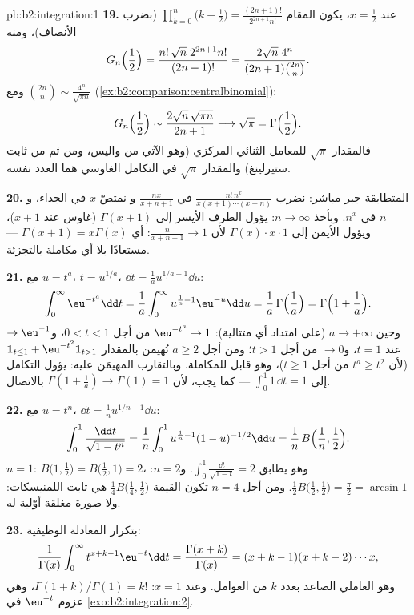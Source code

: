 \begin{solution}{pb:b2:integration:1}
\textbf{19.} عند $x = \frac12$، يكون المقام
$\prod_{k=0}^n\bigl(k+\frac12\bigr) =
\frac{(2n+1)!}{2^{2n+1}n!}$ (بضرب الأنصاف)، ومنه
\[
G_n\Bigl(\frac12\Bigr)
= \frac{n!\,\sqrt n\;2^{2n+1}n!}{(2n+1)!}
= \frac{2\sqrt n\;4^n}{(2n+1)\binom{2n}{n}} .
\]
ومع $\binom{2n}{n} \sim \frac{4^n}{\sqrt{\pi n}}$
(\cref{ex:b2:comparison:centralbinomial}):
\[
G_n\Bigl(\frac12\Bigr)
\sim \frac{2\sqrt n\,\sqrt{\pi n}}{2n+1}
\longrightarrow \sqrt\pi = \Gamma\Bigl(\frac12\Bigr) .
\]
فالمقدار $\sqrt\pi$ للمعامل الثنائي المركزي (وهو الآتي من
واليس، ومن ثم من ثابت ستيرلينغ) والمقدار $\sqrt\pi$ في التكامل
الغاوسي هما العدد نفسه.

\textbf{20.} المتطابقة جبر مباشر: نضرب
$\frac{n!\,n^x}{x(x+1)\cdots(x+n)}$ في $\frac{nx}{x+n+1}$ و
نمتصّ $x$ في الجداء، و$n$ في $n^x$. وبأخذ $n \to
\infty$: يؤول الطرف الأيسر إلى $\Gamma(x+1)$ (غاوس عند $x+1$)،
ويؤول الأيمن إلى $\Gamma(x)\cdot x\cdot 1$ لأن
$\frac{n}{x+n+1} \to 1$: أي $\Gamma(x+1) = x\Gamma(x)$ ---
مستعادًا بلا أي مكاملة بالتجزئة.

\textbf{21.} مع $u = t^a$، $t = u^{1/a}$، $\dd t = \frac1a
u^{1/a - 1}\dd u$:
\[
\int_0^\infty \eu^{-t^a}\dd t
= \frac1a\int_0^\infty u^{\frac1a - 1}\eu^{-u}\dd u
= \frac1a\,\Gamma\Bigl(\frac1a\Bigr)
= \Gamma\Bigl(1 + \frac1a\Bigr) .
\]
وحين $a \to +\infty$ (على امتداد أي متتالية): $\eu^{-t^a} \to 1$ من أجل
$0 < t < 1$، و$\to \eu^{-1}$ عند $t = 1$، و$\to 0$ من أجل $t > 1$؛
ومن أجل $a \geq 2$ نُهيمن بالمقدار $\mathbf 1_{t \leq 1} +
\eu^{-t^2}\mathbf 1_{t > 1}$ (لأن $t^a \geq t^2$ من أجل $t \geq 1$)،
وهو قابل للمكاملة. وبالتقارب المهيمَن عليه: يؤول التكامل إلى
$\int_0^1 1\,\dd t = 1$ --- كما يجب، لأن $\Gamma(1 +
\frac1a) \to \Gamma(1) = 1$ بالاتصال.

\textbf{22.} مع $u = t^n$، $\dd t = \frac1n u^{1/n - 1}\dd
u$:
\[
\int_0^1 \frac{\dd t}{\sqrt{1-t^n}}
= \frac1n\int_0^1 u^{\frac1n-1}(1-u)^{-1/2}\dd u
= \frac1n\,B\Bigl(\frac1n, \frac12\Bigr) .
\]
$n = 1$: $B\bigl(1,\frac12\bigr) = B\bigl(\frac12,1\bigr) = 2$،
وهو يطابق $\int_0^1\frac{\dd t}{\sqrt{1-t}} = 2$. و$n = 2$:
$\frac12 B\bigl(\frac12,\frac12\bigr) = \frac\pi2 = \arcsin 1$.
ومن أجل $n = 4$ تكون القيمة $\frac14 B\bigl(\frac14,\frac12\bigr)$ هي
ثابت اللمنيسكات: ولا صورة مغلقة أوّلية له.

\textbf{23.} بتكرار المعادلة الوظيفية:
\[
\frac{1}{\Gamma(x)}\int_0^\infty t^{x+k-1}\eu^{-t}\dd t
= \frac{\Gamma(x+k)}{\Gamma(x)}
= (x+k-1)(x+k-2)\cdots x ,
\]
وهو العاملي الصاعد بعدد $k$ من العوامل. وعند $x = 1$:
$\Gamma(1+k)/\Gamma(1) = k!$، وهي عزوم $\eu^{-t}$ في
\cref{exo:b2:integration:2}.


\end{solution}
